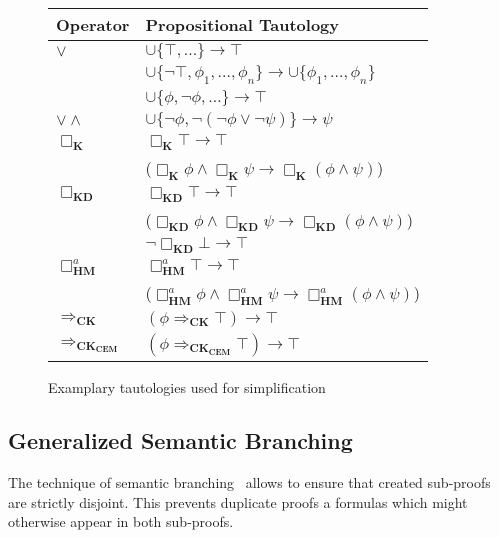 \documentclass{llncs}
\begin{document}
\begin{footnotesize}
\begin{figure}[!h]
  \begin{center}
\begin{tabular}{| l | l |}
\hline
Operator & Propositional Tautology \\
\hline
$\vee$ & $\cup\{\top,...\}\rightarrow \top$ \\
&  $\cup\{\neg\top,\phi_1,\ldots,\phi_n\}\rightarrow \cup\{\phi_1,\ldots,\phi_n\}$ \\
&  $\cup\{\phi,\neg\phi,\ldots\}\rightarrow \top$ \\
\hline
$\vee\wedge$ & $\cup\{\neg\phi,\neg(\neg\phi\vee\neg\psi)\}\rightarrow\psi$\\
\hline
$\Box_\mathbf{K}$ &  $\Box_\mathbf{K}\top\rightarrow \top$ \\
 & ($\Box_\mathbf{K}\phi\wedge\Box_\mathbf{K}\psi\rightarrow \Box_\mathbf{K}(\phi\wedge\psi)$) \\
\hline
$\Box_\mathbf{KD}$ & $\Box_\mathbf{KD}\top\rightarrow \top$ \\
 & ($\Box_\mathbf{KD}\phi\wedge\Box_\mathbf{KD}\psi\rightarrow \Box_\mathbf{KD}(\phi\wedge\psi)$) \\
 & $\neg\Box_\mathbf{KD}\bot\rightarrow \top$ \\
\hline
$\Box^a_\mathbf{HM}$ &  $\Box^a_\mathbf{HM}\top\rightarrow \top$ \\
 & ($\Box^a_\mathbf{HM}\phi\wedge\Box^a_\mathbf{HM}\psi\rightarrow \Box^a_\mathbf{HM}(\phi\wedge\psi)$) \\
\hline
$\Rightarrow_\mathbf{CK}$ & $(\phi\Rightarrow_\mathbf{CK}\top)\rightarrow\top$ \\
\hline
$\Rightarrow_\mathbf{CK_{CEM}}$ & $(\phi\Rightarrow_\mathbf{CK_{CEM}}\top)\rightarrow\top$ \\
 \hline
 \end{tabular}
  \end{center}
  \caption{Examplary tautologies used for simplification}
  \label{fig:tauts}
\end{figure}
\end{footnotesize}

\subsection{Generalized Semantic Branching}

The technique of semantic branching~\cite{HorrocksPatelSchneider99} allows to ensure that created
sub-proofs are strictly disjoint. This prevents duplicate proofs a formulas
which might otherwise appear in both sub-proofs.
\end{document}
